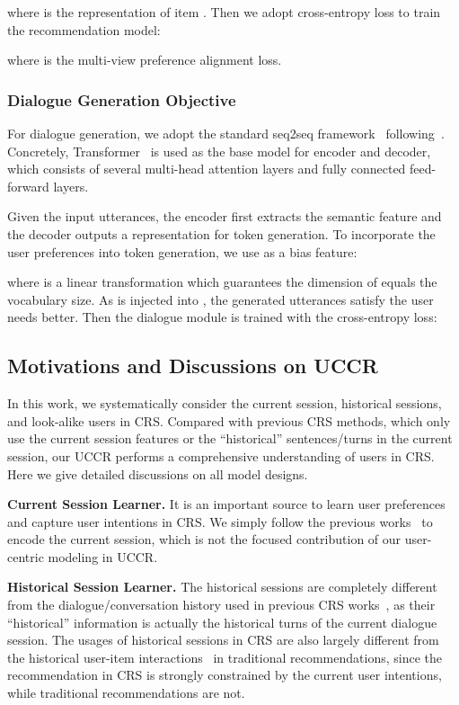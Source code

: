 \documentclass[sigconf,natbib=true]{acmart}
\begin{document}
where  is the representation of item . Then we adopt cross-entropy loss to train the recommendation model:

where  is the multi-view preference alignment loss.



\subsubsection{Dialogue Generation Objective}

For dialogue generation, we adopt the standard seq2seq framework~\cite{sutskever2014sequence} following~\cite{chen2019towards,zhou2020improving}. Concretely, Transformer~\cite{vaswani2017attention} is used as the base model for encoder and decoder, which consists of several multi-head attention layers and fully connected feed-forward layers.

Given the input utterances, the encoder first extracts the semantic feature and the decoder outputs a representation  for token generation. To incorporate the user preferences into token generation, we use  as a bias feature:

where  is a linear transformation which guarantees the dimension of  equals the vocabulary size. As  is injected into , the generated utterances satisfy the user needs better. Then the dialogue module is trained with the cross-entropy loss:


\subsection{Motivations and Discussions on UCCR}
In this work, we systematically consider the current session, historical sessions, and look-alike users in CRS. Compared with previous CRS methods, which only use the current session features or the ``historical'' sentences/turns in the current session, our UCCR performs a comprehensive understanding of users in CRS. Here we give detailed discussions on all model designs.

\noindent
\textbf{Current Session Learner.} It is an important source to learn user preferences and capture user intentions in CRS. We simply follow the previous works~\cite{chen2019towards,zhou2020improving} to encode the current session, which is not the focused contribution of our user-centric modeling in UCCR. 

\noindent
\textbf{Historical Session Learner.} The historical sessions are completely different from the dialogue/conversation history used in previous CRS works~\cite{chen2019towards,zhou2020improving,zhou2020towards}, as their ``historical'' information is actually the historical turns of the current dialogue session. The usages of historical sessions in CRS are also largely different from the historical user-item interactions~\cite{chang2021sequential,wang2021sequential} in traditional recommendations, since the recommendation in CRS is strongly constrained by the current user intentions, while traditional recommendations are not.
\end{document}

